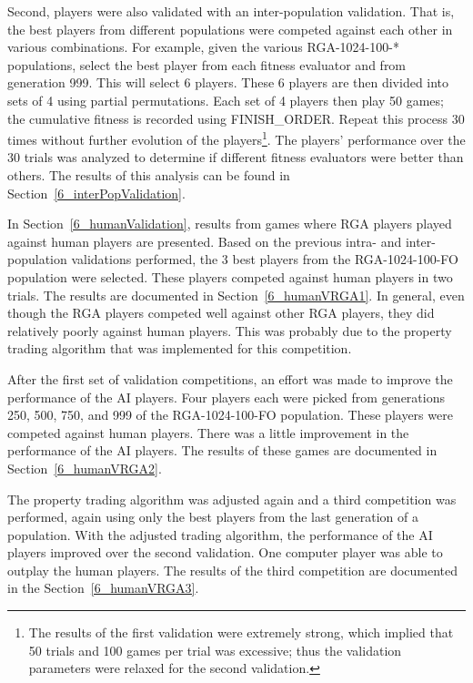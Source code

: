 Second, players were also validated with an inter-population validation. That
is, the best players from different populations were competed against each other
in various combinations. For example, given the various RGA-1024-100-*
populations, select the best player from each fitness evaluator and from
generation 999. This will select 6 players. These 6 players are then divided
into sets of 4 using partial permutations. Each set of 4 players then play 50
games; the cumulative fitness is recorded using FINISH\_ORDER. Repeat this
process 30 times without further evolution of the players\footnote{The results
of the first validation were extremely strong, which implied that 50 trials and
100 games per trial was excessive; thus the validation parameters were relaxed
for the second validation.}. The players' performance over the 30 trials was
analyzed to determine if different fitness evaluators were better than others.
The results of this analysis can be found in Section~\ref{6_interPopValidation}.

In Section~\ref{6_humanValidation}, results from games where RGA players played
against human players are presented. Based on the previous intra- and
inter-population validations performed, the 3 best players from the
RGA-1024-100-FO population were selected. These players competed against human
players in two trials. The results are documented in Section~\ref{6_humanVRGA1}.
In general, even though the RGA players competed well against other RGA
players, they did relatively poorly against human players. This was probably
due to the property trading algorithm that was implemented for this competition.

After the first set of validation competitions, an effort was made to improve
the performance of the AI players. Four players each were picked from
generations 250, 500, 750, and 999 of the RGA-1024-100-FO population. These
players were competed against human players. There was a little improvement in
the performance of the AI players. The results of these games are documented in
Section~\ref{6_humanVRGA2}.

The property trading algorithm was adjusted again and a third competition was
performed, again using only the best players from the last generation of a
population. With the adjusted trading algorithm, the performance of the AI
players improved over the second validation. One computer player was able to
outplay the human players. The results of the third competition are documented
in the Section~\ref{6_humanVRGA3}.

